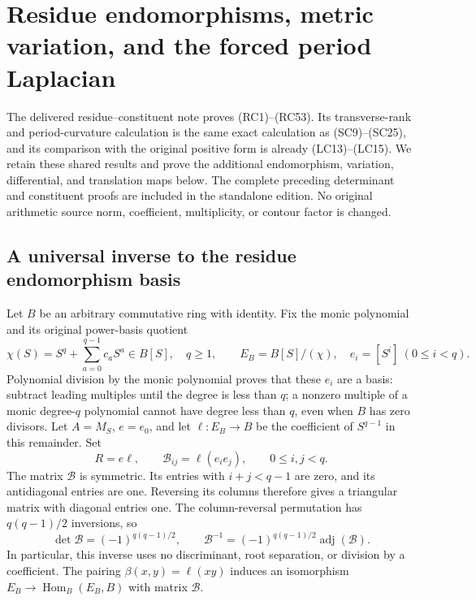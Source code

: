 \section{Residue endomorphisms, metric variation, and the forced period Laplacian}
\label{sec:residue-constituent-extension}

The delivered residue--constituent note proves (RC1)--(RC53).
Its transverse-rank and period-curvature calculation is the same exact
calculation as (SC9)--(SC25), and its comparison with the original positive
form is already (LC13)--(LC15). We retain these shared results and prove
the additional endomorphism, variation, differential, and translation
maps below. The complete preceding determinant and constituent proofs
are included in the standalone edition. No original arithmetic source
norm, coefficient, multiplicity, or contour factor is changed.

\subsection{A universal inverse to the residue endomorphism basis}

Let \(B\) be an arbitrary commutative ring with identity. Fix the monic
polynomial and its original power-basis quotient
\[
 \chi(S)=S^q+\sum_{a=0}^{q-1}c_aS^a\in B[S],\quad q\ge1,\qquad
 E_B=B[S]/(\chi),\quad e_i=[S^i]\ (0\le i<q).
 \tag{RCX1}
\]
Polynomial division by the monic polynomial proves that these \(e_i\)
are a basis: subtract leading multiples until the degree is less than
\(q\); a nonzero multiple of a monic degree-\(q\) polynomial cannot
have degree less than \(q\), even when \(B\) has zero divisors.
Let \(A=M_S\), \(e=e_0\), and let
\(\ell:E_B\to B\) be the coefficient of \(S^{q-1}\) in this remainder.
Set
\[
 R=e\ell,\qquad
 \mathcal B_{ij}=\ell(e_ie_j),\qquad 0\le i,j<q.
 \tag{RCX2}
\]
The matrix \(\mathcal B\) is symmetric. Its entries with \(i+j<q-1\)
are zero, and its antidiagonal entries are one. Reversing its columns
therefore gives a triangular matrix with diagonal entries one. The
column-reversal permutation has \(q(q-1)/2\) inversions, so
\[
 \det\mathcal B=(-1)^{q(q-1)/2},\qquad
 \mathcal B^{-1}=(-1)^{q(q-1)/2}\operatorname{adj}(\mathcal B).
 \tag{RCX3}
\]
In particular, this inverse uses no discriminant, root separation, or
division by a coefficient. The pairing
\(\beta(x,y)=\ell(xy)\) induces an isomorphism
\(E_B\to\operatorname{Hom}_B(E_B,B)\) with matrix \(\mathcal B\).

